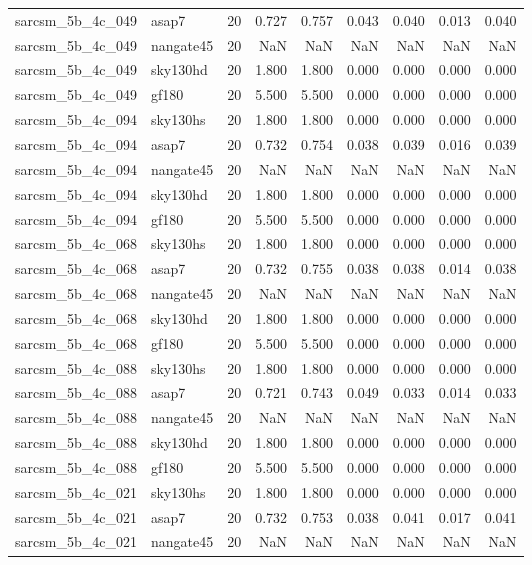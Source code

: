 \begin{tabular}{llrrrrrrr}
sarcsm\_5b\_4c\_049 & asap7 & 20 & 0.727 & 0.757 & 0.043 & 0.040 & 0.013 & 0.040 \\
sarcsm\_5b\_4c\_049 & nangate45 & 20 & NaN & NaN & NaN & NaN & NaN & NaN \\
sarcsm\_5b\_4c\_049 & sky130hd & 20 & 1.800 & 1.800 & 0.000 & 0.000 & 0.000 & 0.000 \\
sarcsm\_5b\_4c\_049 & gf180 & 20 & 5.500 & 5.500 & 0.000 & 0.000 & 0.000 & 0.000 \\
sarcsm\_5b\_4c\_094 & sky130hs & 20 & 1.800 & 1.800 & 0.000 & 0.000 & 0.000 & 0.000 \\
sarcsm\_5b\_4c\_094 & asap7 & 20 & 0.732 & 0.754 & 0.038 & 0.039 & 0.016 & 0.039 \\
sarcsm\_5b\_4c\_094 & nangate45 & 20 & NaN & NaN & NaN & NaN & NaN & NaN \\
sarcsm\_5b\_4c\_094 & sky130hd & 20 & 1.800 & 1.800 & 0.000 & 0.000 & 0.000 & 0.000 \\
sarcsm\_5b\_4c\_094 & gf180 & 20 & 5.500 & 5.500 & 0.000 & 0.000 & 0.000 & 0.000 \\
sarcsm\_5b\_4c\_068 & sky130hs & 20 & 1.800 & 1.800 & 0.000 & 0.000 & 0.000 & 0.000 \\
sarcsm\_5b\_4c\_068 & asap7 & 20 & 0.732 & 0.755 & 0.038 & 0.038 & 0.014 & 0.038 \\
sarcsm\_5b\_4c\_068 & nangate45 & 20 & NaN & NaN & NaN & NaN & NaN & NaN \\
sarcsm\_5b\_4c\_068 & sky130hd & 20 & 1.800 & 1.800 & 0.000 & 0.000 & 0.000 & 0.000 \\
sarcsm\_5b\_4c\_068 & gf180 & 20 & 5.500 & 5.500 & 0.000 & 0.000 & 0.000 & 0.000 \\
sarcsm\_5b\_4c\_088 & sky130hs & 20 & 1.800 & 1.800 & 0.000 & 0.000 & 0.000 & 0.000 \\
sarcsm\_5b\_4c\_088 & asap7 & 20 & 0.721 & 0.743 & 0.049 & 0.033 & 0.014 & 0.033 \\
sarcsm\_5b\_4c\_088 & nangate45 & 20 & NaN & NaN & NaN & NaN & NaN & NaN \\
sarcsm\_5b\_4c\_088 & sky130hd & 20 & 1.800 & 1.800 & 0.000 & 0.000 & 0.000 & 0.000 \\
sarcsm\_5b\_4c\_088 & gf180 & 20 & 5.500 & 5.500 & 0.000 & 0.000 & 0.000 & 0.000 \\
sarcsm\_5b\_4c\_021 & sky130hs & 20 & 1.800 & 1.800 & 0.000 & 0.000 & 0.000 & 0.000 \\
sarcsm\_5b\_4c\_021 & asap7 & 20 & 0.732 & 0.753 & 0.038 & 0.041 & 0.017 & 0.041 \\
sarcsm\_5b\_4c\_021 & nangate45 & 20 & NaN & NaN & NaN & NaN & NaN & NaN \\

\end{tabular}
